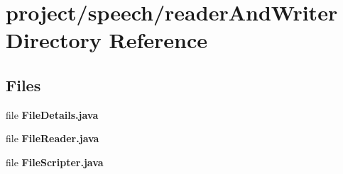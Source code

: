 \section{project/speech/reader\+And\+Writer Directory Reference}
\label{dir_2877e4666b87348387ed421271ef7519}
\subsection*{Files}
\begin{DoxyCompactItemize}
\item 
file {\bfseries File\+Details.\+java}
\item 
file {\bfseries File\+Reader.\+java}
\item 
file {\bfseries File\+Scripter.\+java}
\end{DoxyCompactItemize}
